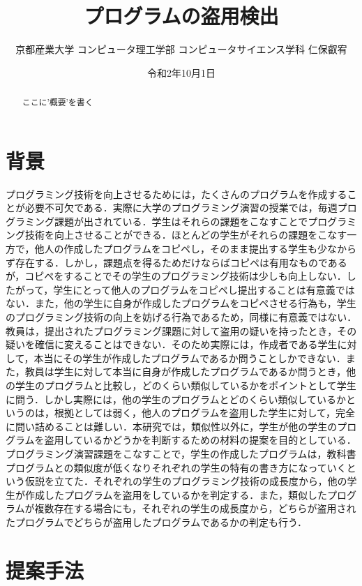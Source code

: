 \documentclass[twocolumn]{jarticle}
\begin{document}
\title{プログラムの盗用検出}
\author{京都産業大学 コンピュータ理工学部 コンピュータサイエンス学科 仁保叡宥}
\date{令和2年10月1日}

\maketitle

\begin{abstract}
ここに'概要'を書く
\end{abstract}


\section*{背景}
プログラミング技術を向上させるためには，たくさんのプログラムを作成することが必要不可欠である．実際に大学のプログラミング演習の授業では，毎週プログラミング課題が出されている．学生はそれらの課題をこなすことでプログラミング技術を向上させることができる．ほとんどの学生がそれらの課題をこなす一方で，他人の作成したプログラムをコピペし，そのまま提出する学生も少なからず存在する．しかし，課題点を得るためだけならばコピペは有用なものであるが，コピペをすることでその学生のプログラミング技術は少しも向上しない．したがって，学生にとって他人のプログラムをコピペし提出することは有意義ではない．また，他の学生に自身が作成したプログラムをコピペさせる行為も，学生のプログラミング技術の向上を妨げる行為であるため，同様に有意義ではない．教員は，提出されたプログラミング課題に対して盗用の疑いを持ったとき，その疑いを確信に変えることはできない．そのため実際には，作成者である学生に対して，本当にその学生が作成したプログラムであるか問うことしかできない．また，教員は学生に対して本当に自身が作成したプログラムであるか問うとき，他の学生のプログラムと比較し，どのくらい類似しているかをポイントとして学生に問う．しかし実際には，他の学生のプログラムとどのくらい類似しているかというのは，根拠としては弱く，他人のプログラムを盗用した学生に対して，完全に問い詰めることは難しい．本研究では，類似性以外に，学生が他の学生のプログラムを盗用しているかどうかを判断するための材料の提案を目的としている．プログラミング演習課題をこなすことで，学生の作成したプログラムは，教科書プログラムとの類似度が低くなりそれぞれの学生の特有の書き方になっていくという仮説を立てた．それぞれの学生のプログラミング技術の成長度から，他の学生が作成したプログラムを盗用をしているかを判定する．また，類似したプログラムが複数存在する場合にも，それぞれの学生の成長度から，どちらが盗用されたプログラムでどちらが盗用したプログラムであるかの判定も行う．

\section*{提案手法}
\end{document}
